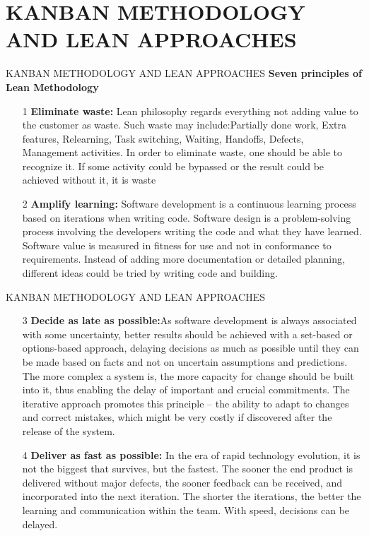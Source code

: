 \documentclass{beamer}
\begin{document}
\section{KANBAN METHODOLOGY AND LEAN APPROACHES}
\begin{frame}{KANBAN METHODOLOGY AND LEAN APPROACHES}
\textbf{Seven principles of Lean Methodology}
\begin{itemize}
	\item[1] \textbf{Eliminate waste:} Lean philosophy regards everything not adding value to the customer as waste. Such 
	waste may include:Partially done work, Extra features, Relearning, Task switching, Waiting, Handoffs, 
	Defects, Management activities. In order to eliminate waste, one should be able to recognize it. If some 
	activity could be bypassed or the result could be achieved without it, it is waste
	\item[2] \textbf{Amplify learning:} Software development is a continuous learning process based on iterations when 
	writing code. Software design is a problem-solving process involving the developers writing the code 
	and what they have learned. Software value is measured in fitness for use and not in conformance to 
	requirements. Instead of adding more documentation or detailed planning, different ideas could be 
	tried by writing code and building.

\end{itemize}
\end{frame}
\begin{frame}{KANBAN METHODOLOGY AND LEAN APPROACHES}
	\begin{itemize}
		\item[3] \textbf{Decide as late as possible:}As software development is always associated with some uncertainty, 
		better results should be achieved with a set-based or options-based approach, delaying decisions as much as possible until they can be made based on facts and not on uncertain assumptions and 
		predictions. The more complex a system is, the more capacity for change should be built into it, thus 
		enabling the delay of important and crucial commitments. The iterative approach promotes this 
		principle – the ability to adapt to changes and correct mistakes, which might be very costly if 
		discovered after the release of the system.

		\item[4] \textbf{Deliver as fast as possible: }In the era of rapid technology evolution, it is not the biggest that survives, 
		but the fastest. The sooner the end product is delivered without major defects, the sooner feedback 
		can be received, and incorporated into the next iteration. The shorter the iterations, the better the 
		learning and communication within the team. With speed, decisions can be delayed.
	\end{itemize}
\end{frame}
\end{document}
